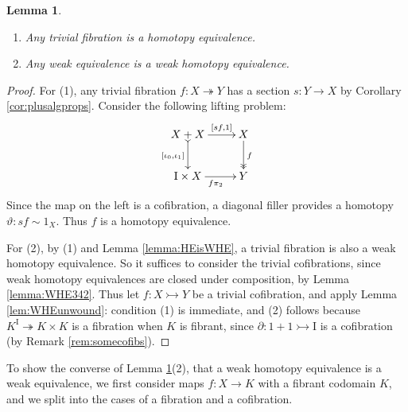 \documentclass[11pt]{amsart}
\newcommand{\mono}{\ensuremath{\rightarrowtail}}
\newcommand{\cof}{\ensuremath{\rightarrowtail}}
\newcommand{\fib}{\ensuremath{\twoheadrightarrow}}
\renewcommand{\to}{\ensuremath{\rightarrow}}
\newcommand{\onto}{\ensuremath{\twoheadrightarrow}}
\newcommand{\I}{\ensuremath{\mathrm{I}}}
\newcommand{\del}{\ensuremath{\partial}}
\newtheorem{lemma}[theorem]{Lemma}
\theoremstyle{remark}
\theoremstyle{definition}
\begin{document}
\begin{lemma}\label{lem:WEimpliesWHE}
\begin{enumerate}
\item Any trivial fibration is a homotopy equivalence.
\item Any weak equivalence is a weak homotopy equivalence.
\end{enumerate}
\end{lemma}

\begin{proof}
For (1), any trivial fibration $f : X \onto Y$ has a section $s: Y\to X$ by Corollary \ref{cor:plusalgprops}.
Consider the following lifting problem:
\begin{equation*}%
\xymatrix{
X+X \ar@{>->}[d]_{[\iota_0, \iota_1]} \ar[r]^-{[sf, 1]}  & X\ar@{>>}[d]^{f} \\
\I\times X \ar[r]_{f\pi_2} & Y
}
\end{equation*}
Since the map on the left is a cofibration, a diagonal filler provides a homotopy $\vartheta : sf \sim 1_X$. 
Thus $f$ is a homotopy equivalence. 

For (2), by (1) and Lemma \ref{lemma:HEisWHE}, a trivial fibration is also a weak homotopy equivalence. So it suffices to consider the trivial cofibrations, since weak homotopy equivalences are closed under composition, by Lemma \ref{lemma:WHE342}.   Thus let $f : X \mono Y$ be a trivial cofibration, and apply Lemma \ref{lem:WHEunwound}: condition (1) is immediate, and (2) follows because $K^\I \fib K\times K$ is a fibration when $K$ is fibrant, since $\del : 1+1 \cof \I$ is a cofibration (by Remark \ref{rem:somecofibs}).

%
\end{proof}

To show the converse of Lemma \ref{lem:WEimpliesWHE}(2), that a weak homotopy equivalence is a weak equivalence, we first consider maps $f : X\to K$ with a fibrant codomain $K$, and we split into the cases of a fibration and a cofibration.  
\end{document}
